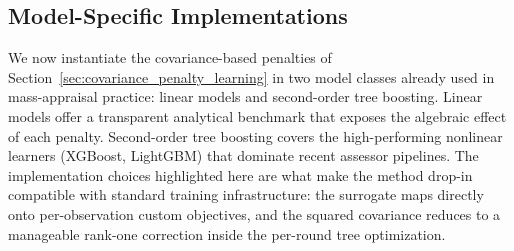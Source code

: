 \documentclass[12pt]{article}
\theoremstyle{plain}
\theoremstyle{definition}
\newcommand{\1}{\mathbf{1}}
\begin{document}




\subsection{Model-Specific Implementations}
\label{sec:model_specific_implementations}

We now instantiate the covariance-based penalties of Section~\ref{sec:covariance_penalty_learning} in two model classes already used in mass-appraisal practice: linear models and second-order tree boosting. Linear models offer a transparent analytical benchmark that exposes the algebraic effect of each penalty. Second-order tree boosting covers the high-performing nonlinear learners (XGBoost, LightGBM) that dominate recent assessor pipelines. The implementation choices highlighted here are what make the method drop-in compatible with standard training infrastructure: the surrogate maps directly onto per-observation custom objectives, and the squared covariance reduces to a manageable rank-one correction inside the per-round tree optimization.
\end{document}
